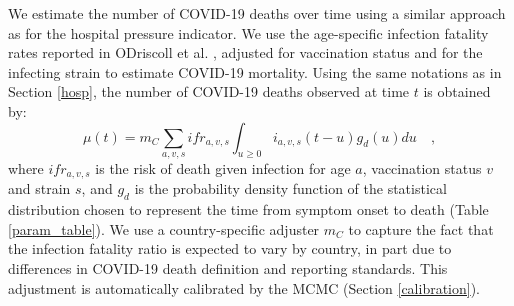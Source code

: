 We estimate the number of COVID-19 deaths over time using a similar approach 
as for the hospital pressure indicator. We use the age-specific infection fatality rates reported in
ODriscoll et al. \cite{odriscoll-2021}, adjusted for vaccination status and for the infecting strain
to estimate COVID-19 mortality. Using the same notations as in Section \ref{hosp}, the number of COVID-19
deaths observed at time $t$ is obtained by:
\begin{equation}
\mu(t) = m_C \sum_{a,v,s} ifr_{a,v,s} \int_{u \geq 0}  i_{a,v,s}(t-u)g_{d}(u) du   \quad,
\end{equation}
where $ifr_{a,v,s}$ is the risk of death given infection for age $a$, vaccination status $v$ and strain $s$, 
and $g_d$ is the probability density function of the statistical distribution chosen to represent the 
time from symptom onset to death (Table \ref{param_table}). We use a country-specific adjuster $m_C$ to 
capture the fact that the infection fatality ratio is expected to vary by country, in part due to 
differences in COVID-19 death definition and reporting standards. This adjustment is automatically calibrated 
by the MCMC (Section \ref{calibration}).